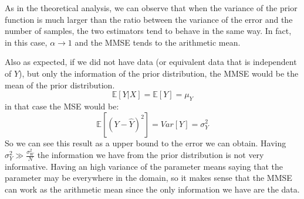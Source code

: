 As in the theoretical analysis, we can observe that when the variance of the prior function is much larger than the ratio between the variance of the error and the number of samples, the two estimators tend to behave in the same way. In fact, in this case, $\alpha\to 1$ and the MMSE tends to the arithmetic mean.

Also as expected, if we did not have data (or equivalent data that is independent of $Y$), but only the information of the prior distribution, the MMSE would be the mean of the prior distribution.
$$
    \mathbb E[Y|X]=\mathbb E[Y]=\mu_Y
$$
in that case the MSE would be:
$$
    \mathbb E[(Y-\hat Y)^2]=Var[Y]=\sigma_Y^2
$$
So we can see this result as a upper bound to the error we can obtain.
Having  $\sigma^2_Y \gg \frac{\sigma^2_W}N$ the information we have from the prior distribution is not very informative. Having an high variance of the parameter means saying that the parameter may be everywhere in the domain, so it makes sense that the MMSE can work as the arithmetic mean since the only information we have are the data.
